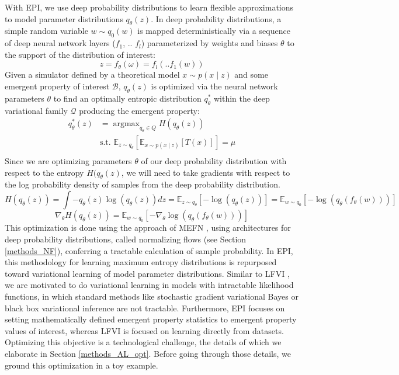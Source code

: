 \documentclass[11pt]{article}
\DeclareMathOperator*{\argmax}{argmax}
\begin{document}
With EPI, we use deep probability distributions to learn flexible approximations to model parameter distributions $q_\theta(z)$.
 In deep probability distributions, a simple random variable $w \sim q_0(w)$ is mapped deterministically via a sequence of deep neural network layers ($f_1$, .. $f_l$) parameterized by weights and biases $\theta$ to the support of the distribution of interest:
\begin{equation}
z = f_{\theta}(\omega) = f_l(..f_1(w))
\end{equation}
Given a simulator defined by a theoretical model $x \sim p(x \mid z)$ and some emergent property of interest $\mathcal{B}$, $q_\theta(z)$ is optimized via the neural network parameters $\theta$ to find an optimally entropic distribution $q_{\theta}^*$ within the deep variational family $\mathcal{Q}$ producing the emergent property:
\begin{equation} \label{eq:opt}
\begin{split}
q_\theta^*(z) &= \argmax_{q_\theta \in Q} H(q_\theta(z)) \\
 &  \text{s.t.  } \mathbb{E}_{z \sim q_\theta}\left[ \mathbb{E}_{x\sim p(x \mid z)}\left[T(x)\right] \right] = \mu \\
 \end{split}
\end{equation} 
Since we are optimizing parameters $\theta$ of our deep probability distribution with respect to the entropy $H(q_\theta(z)$, we will need to take gradients with respect to the log probability density of samples from the deep probability distribution.
\begin{equation}
H(q_\theta(z)) = \int - q_\theta(z) \log(q_\theta(z)) dz = \mathbb{E}_{z \sim q_\theta}\left[-\log(q_\theta(z)) \right] = \mathbb{E}_{w \sim q_0}\left[-\log(q_\theta(f_\theta(w))) \right]
\end{equation}
\begin{equation}
\nabla_\theta H(q_\theta(z)) = \mathbb{E}_{w \sim q_0}\left[- \nabla_\theta \log(q_\theta(f_\theta(w))) \right]
\end{equation}
This optimization is done using the approach of MEFN \cite{loaiza2017maximum}, using architectures for deep probability distributions, called normalizing flows (see Section \ref{methods_NF}), conferring a tractable calculation of sample probability.  In EPI, this methodology for learning maximum entropy distributions is repurposed toward variational learning of model parameter distributions.  
Similar to LFVI \cite{tran2017hierarchical}, we are motivated to do variational learning in models with intractable likelihood functions, in which standard methods like stochastic gradient variational Bayes \cite{kingma2013auto} or black box variational inference\cite{ranganath2014black} are not tractable.  Furthermore, EPI focuses on setting mathematically defined emergent property statistics to emergent property values of interest, whereas LFVI is focused on learning directly from datasets.  Optimizing this objective is a technological challenge, the details of which we elaborate in Section \ref{methods_AL_opt}.  Before going through those details, we ground this optimization in a toy example.
\end{document}
